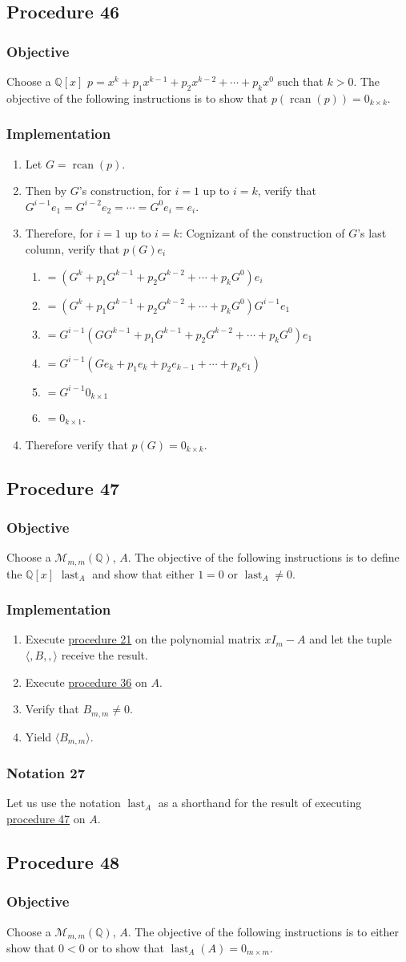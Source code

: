 \documentclass[twocolumn]{article}
\DeclareMathOperator{\rcan}{rcan}
\DeclareMathOperator{\last}{last}
\newcommand{\notation}[1]{\subsubsection*{Notation #1}}
\newcommand{\procedure}[2][]{\subsection*{Procedure #2 \ifthenelse{\equal{#1}{}}{}{(#1)}}\label{sec:procedure #2}}
\newcommand{\objective}{\subsubsection*{Objective}}
\newcommand{\implementation}{\subsubsection*{Implementation}}
\begin{document}
		\procedure{46}
			\objective
				Choose a $\mathbb{Q}[x]$ $p=x^k+p_1x^{k-1}+p_2x^{k-2}+\cdots+p_kx^0$ such that $k>0$. The objective of the following instructions is to show that $p(\rcan(p))=0_{k\times k}$.
			\implementation
				\begin{enumerate}
					\item Let $G=\rcan(p)$.
					\item Then by $G$'s construction, for $i=1$ up to $i=k$, verify that $G^{i-1}e_1=G^{i-2}e_2=\cdots=G^{0}e_i=e_i$.
					\item Therefore, for $i=1$ up to $i=k$: Cognizant of the construction of $G$'s last column, verify that $p(G)e_i$
					\begin{enumerate}
						\item $=(G^k+p_1G^{k-1}+p_2G^{k-2}+\cdots+p_kG^0)e_i$
						\item $=(G^k+p_1G^{k-1}+p_2G^{k-2}+\cdots+p_kG^0)G^{i-1}e_1$
						\item $=G^{i-1}(GG^{k-1}+p_1G^{k-1}+p_2G^{k-2}+\cdots+p_kG^0)e_1$
						\item $=G^{i-1}(Ge_k+p_1e_k+p_2e_{k-1}+\cdots+p_ke_1)$
						\item $=G^{i-1}0_{k\times 1}$
						\item $=0_{k\times 1}$.
					\end{enumerate}
					\item Therefore verify that $p(G)=0_{k\times k}$.
				\end{enumerate}
		\procedure{47}
			\objective
				Choose a $\mathcal{M}_{m,m}(\mathbb{Q})$, $A$. The objective of the following instructions is to define the $\mathbb{Q}[x]$ $\last_A$ and show that either $1=0$ or $\last_A\ne 0$.
			\implementation
				\begin{enumerate}
					\item Execute \hyperref[sec:procedure 21]{procedure 21} on the polynomial matrix $xI_m-A$ and let the tuple $\langle,B,,\rangle$ receive the result.
					\item Execute \hyperref[sec:procedure 36]{procedure 36} on $A$.
					\item Verify that $B_{m,m}\ne 0$.
					\item Yield $\langle B_{m,m}\rangle$.
				\end{enumerate}
		\notation{27}
			Let us use the notation $\last_A$ as a shorthand for the result of executing \hyperref[sec:procedure 47]{procedure 47} on $A$.
		\procedure{48}
			\objective
				Choose a $\mathcal{M}_{m,m}(\mathbb{Q})$, $A$. The objective of the following instructions is to either show that $0<0$ or to show that $\last_A(A)=0_{m\times m}$.
\end{document}
